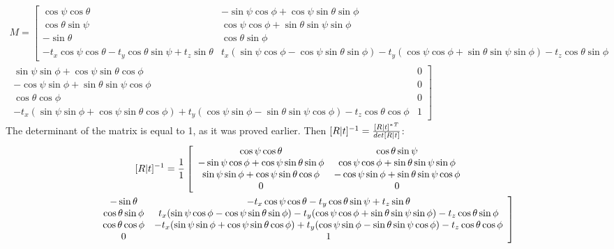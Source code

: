 \documentclass[a4paper, twoside, english]{article}
\begin{document}
\begin{equation*}
	\begin{gathered}
		M=\left[
		\begin{array}{cccc}
			\cos\psi\cos\theta & -\sin\psi\cos\phi+\cos\psi\sin\theta\sin\phi \\
			\cos\theta\sin\psi & \cos\psi\cos\phi+\sin\theta\sin\psi\sin\phi \\
			-\sin\theta & \cos\theta\sin\phi& \\
			-t_x\cos\psi\cos\theta - t_y\cos\theta\sin\psi + t_z\sin\theta & t_x(\sin\psi\cos\phi-\cos\psi\sin\theta\sin\phi) -t_y(\cos\psi\cos\phi+\sin\theta\sin\psi\sin\phi) -t_z\cos\theta\sin\phi 
		\end{array}
		\right. \\
		\left.
		\begin{array}{cccc}
			\sin\psi\sin\phi+\cos\psi\sin\theta\cos\phi & 0\\
			-\cos\psi\sin\phi+\sin\theta\sin\psi\cos\phi & 0\\
			\cos\theta\cos\phi & 0\\
			-t_x(\sin\psi\sin\phi+\cos\psi\sin\theta\cos\phi)+t_y(\cos\psi\sin\phi-\sin\theta\sin\psi\cos\phi) - t_z\cos\theta\cos\phi&1
		\end{array}
		\right]
	\end{gathered}
\end{equation*}
\normalsize
The determinant of the matrix is equal to 1, as it was proved earlier. Then ${[R|t]^{-1}}={{{[R|t]^*}^T}\over{det[R|t]}}$:\\
\tiny
\begin{equation*}
	\begin{gathered}
		[R|t]^{-1}={1\over 1}		
			\left[
		\begin{array}{cccc}
			\cos\psi\cos\theta & \cos\theta\sin\psi \\
			-\sin\psi\cos\phi+\cos\psi\sin\theta\sin\phi & \cos\psi\cos\phi+\sin\theta\sin\psi\sin\phi \\
			\sin\psi\sin\phi+\cos\psi\sin\theta\cos\phi & -\cos\psi\sin\phi+\sin\theta\sin\psi\cos\phi& \\
			0&0
		\end{array}
		\right. \\
		\left.
		\begin{array}{cccc}
			-\sin\theta & -t_x\cos\psi\cos\theta - t_y\cos\theta\sin\psi + t_z\sin\theta \\
			\cos\theta\sin\phi &  t_x(\sin\psi\cos\phi-\cos\psi\sin\theta\sin\phi) -t_y(\cos\psi\cos\phi+\sin\theta\sin\psi\sin\phi) -t_z\cos\theta\sin\phi\\
			\cos\theta\cos\phi & -t_x(\sin\psi\sin\phi+\cos\psi\sin\theta\cos\phi)+t_y(\cos\psi\sin\phi-\sin\theta\sin\psi\cos\phi) - t_z\cos\theta\cos\phi\\
			0&1
		\end{array}
		\right]
	\end{gathered}
\end{equation*}
\end{document}

